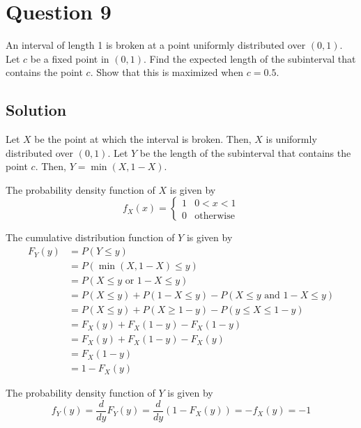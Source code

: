 \section*{Question 9}

An interval of length 1 is broken at a point uniformly distributed over \( (0,1) \).
Let \( c \) be a fixed point in \( (0,1) \).
Find the expected length of the subinterval that contains the point \( c \).
Show that this is maximized when \( c=0.5 \).

\subsection*{Solution}

Let \( X \) be the point at which the interval is broken.
Then, \( X \) is uniformly distributed over \( (0,1) \).
Let \( Y \) be the length of the subinterval that contains the point \( c \).
Then, \( Y = \min(X, 1-X) \).

The probability density function of \( X \) is given by
\[
    f_{X}(x) = \begin{cases}
        1 & 0 < x < 1        \\
        0 & \text{otherwise}
    \end{cases}
\]

The cumulative distribution function of \( Y \) is given by
\begin{align*}
    F_{Y}(y) & = P(Y \leq y)                                                       \\
             & = P(\min(X, 1-X) \leq y)                                            \\
             & = P(X \leq y \text{ or } 1-X \leq y)                                \\
             & = P(X \leq y) + P(1-X \leq y) - P(X \leq y \text{ and } 1-X \leq y) \\
             & = P(X \leq y) + P(X \geq 1-y) - P(y \leq X \leq 1-y)                \\
             & = F_{X}(y) + F_{X}(1-y) - F_{X}(1-y)                                \\
             & = F_{X}(y) + F_{X}(1-y) - F_{X}(y)                                  \\
             & = F_{X}(1-y)                                                        \\
             & = 1 - F_{X}(y)
\end{align*}

The probability density function of \( Y \) is given by
\[
    f_{Y}(y) = \frac{d}{dy} F_{Y}(y) = \frac{d}{dy} (1 - F_{X}(y)) = -f_{X}(y) = -1
\]

